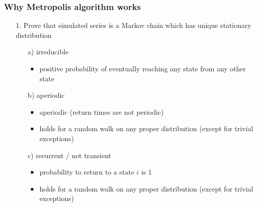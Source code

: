 \documentclass[10pt,handout]{beamer}
\begin{document}
\begin{frame}

\frametitle{ Why Metropolis algorithm works}

  \begin{itemize}
  \item[1.] Prove that simulated series is a Markov chain
    which has unique stationary distribution
    \begin{itemize}
    \item[a)] irreducible
      \begin{itemize}
      \item<2->[=] positive probability of eventually reaching any
        state from any other state
      \end{itemize}
    \item[b)] aperiodic
      \begin{itemize}
      \item<3->[=] aperiodic (return times are not periodic)
      \item<3->[-] holds for a random walk on any proper distribution (except for trivial exceptions)
      \end{itemize}
    \item[c)] recurrent / not transient
      \begin{itemize}
      \item<4->[=] probability to return to a state $i$ is 1
      \item<4->[-] holds for a random walk on any proper distribution (except for trivial exceptions)
      \end{itemize}
    \end{itemize}
  \end{itemize}

\end{frame}
\end{document}
